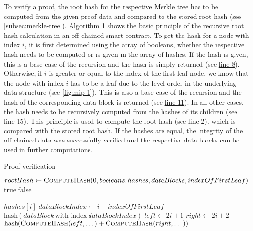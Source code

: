 			To verify a proof, the root hash for the respective Merkle tree has to be computed from the given proof data and compared to the stored root hash (see \autoref{subsec:merkle-tree}).
			\hyperref[alg:proof-verification]{Algorithm 1} shows the basic principle of the recursive root hash calculation in an off-chained smart contract.
			To get the hash for a node with index $i$, it is first determined using the array of booleans, whether the respective hash needs to be computed or is given in the array of hashes.
			If the hash is given, this is a base case of the recursion and the hash is simply returned (see \hyperref[algline:8]{line 8}).
			Otherwise, if $i$ is greater or equal to the index of the first leaf node, we know that the node with index $i$ has to be a leaf due to the level order in the underlying data structure (see \autoref{fig:mip-1}).
			This is also a base case of the recursion and the hash of the corresponding data block is returned (see \hyperref[algline:11]{line 11}).
			In all other cases, the hash needs to be recursively computed from the hashes of its children (see \hyperref[algline:15]{line 15}).
			This principle is used to compute the root hash (see \hyperref[algline:2]{line 2}), which is compared with the stored root hash.
			If the hashes are equal, the integrity of the off-chained data was successfully verified and the respective data blocks can be used in further computations.

			\begin{algorithm}
				\caption{Proof verification}
				\label{alg:proof-verification}

				\begin{algorithmic}[1]
						\State $rootHash \gets \Call{ComputeHash}{0, booleans, hashes, dataBlocks, indexOfFirstLeaf}$ \label{algline:2}
						 \Return true 
						\Else{} \Return false 
						\EndIf	
					\EndProcedure

					\State
						 
							\State \Return $hashes[i]$ \label{algline:8}
						 
							\State $dataBlockIndex \gets i - indexOfFirstLeaf$ 
							\State \Return $\textrm{hash}(dataBlock\ \textrm{with index}\ dataBlockIndex)$ \label{algline:11}
						\Else{} 
							\State $left \gets 2i + 1$ 
							\State $right \gets 2i + 2$ 
							\State \Return $\textrm{hash}(\Call{ComputeHash}{left, \dots} + \Call{ComputeHash}{right, \dots})$ \label{algline:15}
						\EndIf
					\EndProcedure
				\end{algorithmic}
			\end{algorithm}
